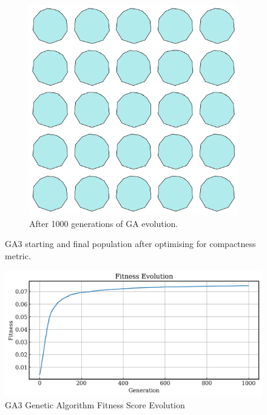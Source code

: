 \documentclass{article}
\begin{document}
\begin{figure}[H]
\begin{subfigure}[b]{0.45\textwidth}
        \includegraphics[width=\textwidth]{figures/GAResults/GA3/final_population.png}
        \caption{After 1000 generations of GA evolution.}
        \label{fig:GA3_final}
    \end{subfigure}
    \caption{GA3 starting and final population after optimising for compactness metric.}
    \label{fig:GA3_before_after_GA}
\end{figure}

\begin{figure}[H]
    \centering
    \includegraphics[width=0.75\linewidth]{figures/GAResults/GA3/1000gens_10pars_100initpop_5pcent_mut.png}
    \caption{GA3 Genetic Algorithm Fitness Score Evolution}
    \label{fig:GA3_fitness}
\end{figure}
\end{document}

